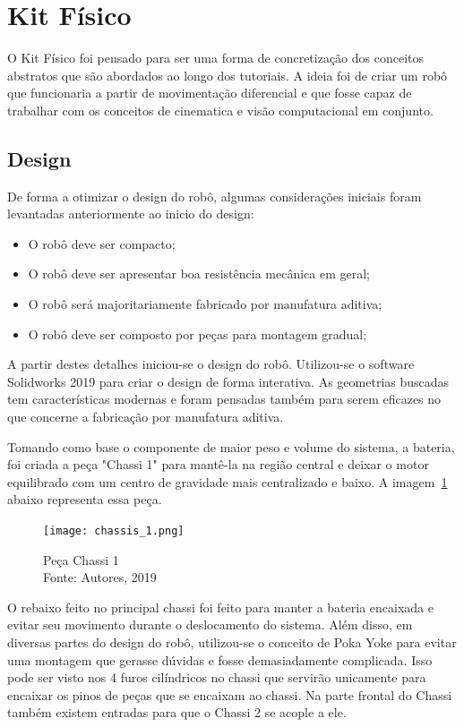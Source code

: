 \section{Kit Físico}
O Kit Físico foi pensado para ser uma forma de concretização dos conceitos abstratos que são abordados ao longo dos tutoriais. A ideia foi de criar um robô que funcionaria a partir de movimentação diferencial e que fosse capaz de trabalhar com os conceitos de cinematica e visão computacional em conjunto.

\subsection{Design}
De forma a otimizar o design do robô, algumas considerações iniciais foram levantadas anteriormente ao inicio do design:

\begin{itemize}
	\item O robô deve ser compacto;
	\item O robô deve ser apresentar boa resistência mecânica em geral;
	\item O robô será majoritariamente fabricado por manufatura aditiva;
	\item O robô deve ser composto por peças para montagem gradual; 
\end{itemize}
A partir destes detalhes iniciou-se o design do robô. Utilizou-se o software Solidworks 2019 para criar o design de forma interativa. As geometrias buscadas tem características modernas e foram pensadas também para serem eficazes no que concerne a fabricação por manufatura aditiva.

Tomando como base o componente de maior peso e volume do sistema, a bateria, foi criada a peça "Chassi 1" para mantê-la na região central e deixar o motor equilibrado com um centro de gravidade mais centralizado e baixo. A imagem~\ref{fig:chassi_1} abaixo representa essa peça.

\begin{figure}[h!]
	\centering
	\texttt{[image: chassis\_1.png]}\\
	\caption{Peça Chassi 1 \\ Fonte: Autores, 2019}
	\label{fig:chassi_1}
\end{figure}

O rebaixo feito no principal chassi foi feito para manter a bateria encaixada e evitar seu movimento durante o deslocamento do sistema. Além disso, em diversas partes do design do robô, utilizou-se o conceito de Poka Yoke para evitar uma montagem que gerasse dúvidas e fosse demasiadamente complicada. Isso pode ser visto nos 4 furos cilíndricos no chassi que servirão unicamente para encaixar os pinos de peças que se encaixam ao chassi. Na parte frontal do Chassi também existem entradas para que o Chassi 2 se acople a ele.

